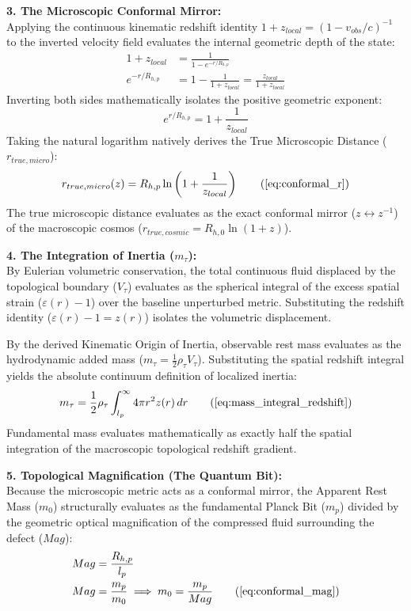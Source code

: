\documentclass[11pt, a4paper]{article}
\begin{document}
\textbf{3. The Microscopic Conformal Mirror:} \\
Applying the continuous kinematic redshift identity $1+z_{local} = (1-v_{obs}/c)^{-1}$ to the inverted velocity field evaluates the internal geometric depth of the state:
\begin{align}
    1+z_{local} &= \frac{1}{1 - e^{-r/R_{h,p}}}  \\
    e^{-r/R_{h,p}} &= 1 - \frac{1}{1+z_{local}} = \frac{z_{local}}{1+z_{local}} 
\end{align}
Inverting both sides mathematically isolates the positive geometric exponent:
\begin{equation}
    e^{r/R_{h,p}} = 1 + \frac{1}{z_{local}} 
\end{equation}
Taking the natural logarithm natively derives the True Microscopic Distance ($r_{true, micro}$):
\begin{equation}
    r_{true, micro}(z) = R_{h,p} \ln\left( 1 + \frac{1}{z_{local}} \right) \tag{\ref{eq:conformal_r}}
\end{equation}
The true microscopic distance evaluates as the exact conformal mirror ($z \leftrightarrow z^{-1}$) of the macroscopic cosmos ($r_{true, cosmic} = R_{h,0} \ln(1+z)$). 

\textbf{4. The Integration of Inertia ($m_\tau$):} \\
By Eulerian volumetric conservation, the total continuous fluid displaced by the topological boundary ($V_\tau$) evaluates as the spherical integral of the excess spatial strain ($\varepsilon(r) - 1$) over the baseline unperturbed metric. Substituting the redshift identity ($\varepsilon(r) - 1 = z(r)$) isolates the volumetric displacement. 

By the derived Kinematic Origin of Inertia, observable rest mass evaluates as the hydrodynamic added mass ($m_\tau = \frac{1}{2} \rho_{\tau} V_\tau$). Substituting the spatial redshift integral yields the absolute continuum definition of localized inertia:
\begin{equation}
    m_\tau = \frac{1}{2} \rho_{\tau} \int_{l_p}^\infty 4\pi r^2 z(r) \, dr \tag{\ref{eq:mass_integral_redshift}}
\end{equation}
Fundamental mass evaluates mathematically as exactly half the spatial integration of the macroscopic topological redshift gradient.

\textbf{5. Topological Magnification (The Quantum Bit):} \\
Because the microscopic metric acts as a conformal mirror, the Apparent Rest Mass ($m_0$) structurally evaluates as the fundamental Planck Bit ($m_p$) divided by the geometric optical magnification of the compressed fluid surrounding the defect ($Mag$):
\begin{align}
    Mag &= \frac{R_{h,p}}{l_p}  \\
    Mag &= \frac{m_p}{m_0} \implies m_0 = \frac{m_p}{Mag} \tag{\ref{eq:conformal_mag}}
\end{align}
\end{document}

